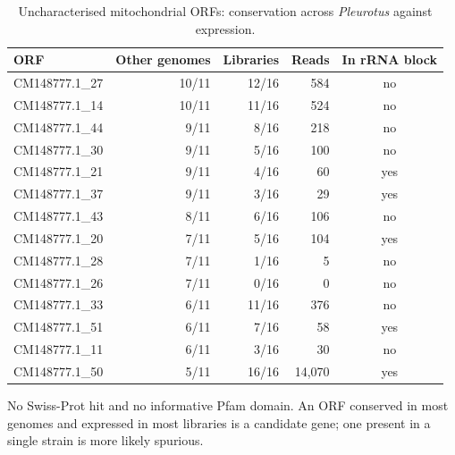 \begin{table}[htbp]
\caption{Uncharacterised mitochondrial ORFs: conservation across \textit{Pleurotus} against expression.}\label{tab:orfcons}
\footnotesize
\begin{tabular}{@{}lrrrc@{}}
\toprule
ORF & Other genomes & Libraries & Reads & In rRNA block \\
\midrule
CM148777.1\_27 & 10/11 & 12/16 & 584 & no \\
CM148777.1\_14 & 10/11 & 11/16 & 524 & no \\
CM148777.1\_44 & 9/11 & 8/16 & 218 & no \\
CM148777.1\_30 & 9/11 & 5/16 & 100 & no \\
CM148777.1\_21 & 9/11 & 4/16 & 60 & yes \\
CM148777.1\_37 & 9/11 & 3/16 & 29 & yes \\
CM148777.1\_43 & 8/11 & 6/16 & 106 & no \\
CM148777.1\_20 & 7/11 & 5/16 & 104 & yes \\
CM148777.1\_28 & 7/11 & 1/16 & 5 & no \\
CM148777.1\_26 & 7/11 & 0/16 & 0 & no \\
CM148777.1\_33 & 6/11 & 11/16 & 376 & no \\
CM148777.1\_51 & 6/11 & 7/16 & 58 & yes \\
CM148777.1\_11 & 6/11 & 3/16 & 30 & no \\
CM148777.1\_50 & 5/11 & 16/16 & 14,070 & yes \\
\bottomrule
\end{tabular}
\begin{tablenotes}[flushleft]\footnotesize\item No Swiss-Prot hit and no informative Pfam domain. An ORF conserved in most genomes and expressed in most libraries is a candidate gene; one present in a single strain is more likely spurious.\end{tablenotes}
\end{table}
